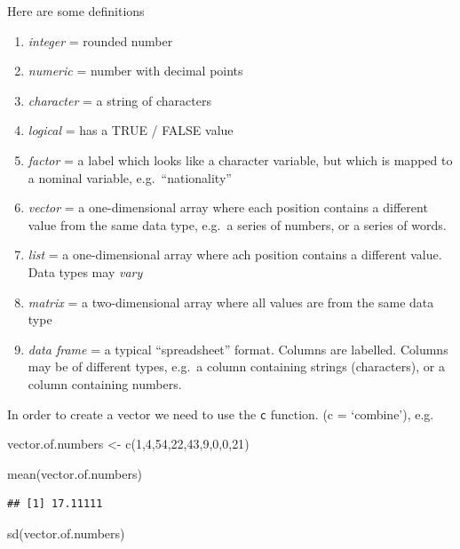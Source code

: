 \documentclass[]{article}
\newenvironment{Shaded}{\begin{snugshade}}{\end{snugshade}}
\newcommand{\DecValTok}[1]{\textcolor[rgb]{0.00,0.00,0.81}{#1}}
\newcommand{\FunctionTok}[1]{\textcolor[rgb]{0.00,0.00,0.00}{#1}}
\newcommand{\NormalTok}[1]{#1}
\newcommand{\OtherTok}[1]{\textcolor[rgb]{0.56,0.35,0.01}{#1}}
\providecommand{\tightlist}{%
  \setlength{\itemsep}{0pt}\setlength{\parskip}{0pt}}
\begin{document}
Here are some definitions

\begin{enumerate}
\def\labelenumi{(\arabic{enumi})}
\tightlist
\item
  \emph{integer} = rounded number
\item
  \emph{numeric} = number with decimal points
\item
  \emph{character} = a string of characters
\item
  \emph{logical} = has a TRUE / FALSE value
\item
  \emph{factor} = a label which looks like a character variable, but
  which is mapped to a nominal variable, e.g.~``nationality''
\item
  \emph{vector} = a one-dimensional array where each position contains a
  different value from the same data type, e.g.~a series of numbers, or
  a series of words.
\item
  \emph{list} = a one-dimensional array where ach position contains a
  different value. Data types may \emph{vary}
\item
  \emph{matrix} = a two-dimensional array where all values are from the
  same data type
\item
  \emph{data frame} = a typical ``spreadsheet'' format. Columns are
  labelled. Columns may be of different types, e.g.~a column containing
  strings (characters), or a column containing numbers.
\end{enumerate}

In order to create a vector we need to use the \texttt{c} function. (c =
`combine'), e.g.

\begin{Shaded}
\begin{Highlighting}[]
\NormalTok{vector.of.numbers }\OtherTok{\textless{}{-}} \FunctionTok{c}\NormalTok{(}\DecValTok{1}\NormalTok{,}\DecValTok{4}\NormalTok{,}\DecValTok{54}\NormalTok{,}\DecValTok{22}\NormalTok{,}\DecValTok{43}\NormalTok{,}\DecValTok{9}\NormalTok{,}\DecValTok{0}\NormalTok{,}\DecValTok{0}\NormalTok{,}\DecValTok{21}\NormalTok{)}

\FunctionTok{mean}\NormalTok{(vector.of.numbers)}
\end{Highlighting}
\end{Shaded}

\begin{verbatim}
## [1] 17.11111
\end{verbatim}

\begin{Shaded}
\begin{Highlighting}[]
\FunctionTok{sd}\NormalTok{(vector.of.numbers)}
\end{Highlighting}
\end{Shaded}
\end{document}
